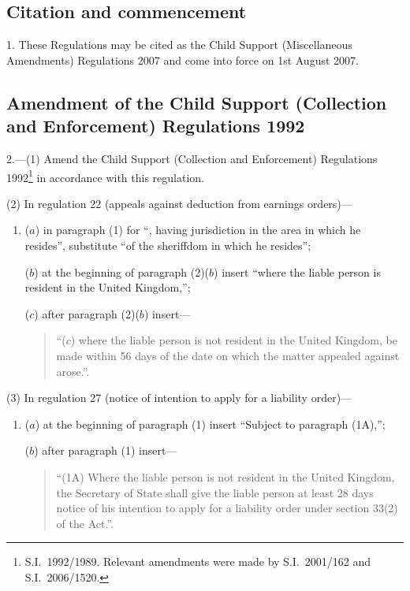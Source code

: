 \documentclass[12pt,a4paper]{article}
\begin{document}
\setcounter{secnumdepth}{-2}

\subsection[1. Citation and commencement]{Citation and commencement}

1.  These Regulations may be cited as the Child Support (Miscellaneous Amendments) Regulations 2007 and come into force on 1st August 2007.

\subsection[2. Amendment of the Child Support (Collection and Enforcement) Regulations 1992]{Amendment of the Child Support (Collection and Enforcement) Regulations 1992}

2.---(1)  Amend the Child Support (Collection and Enforcement) Regulations 1992\footnote{S.I.\ 1992/1989. Relevant amendments were made by S.I.\ 2001/162 and S.I.\ 2006/1520.} in accordance with this regulation.

(2) In regulation 22 (appeals against deduction from earnings orders)—
\begin{enumerate}\item[]
($a$) in paragraph (1) for “, having jurisdiction in the area in which he resides”, substitute “of the sheriffdom in which he resides”;

($b$) at the beginning of paragraph (2)($b$)  insert “where the liable person is resident in the United Kingdom,”;

($c$) after paragraph (2)($b$)  insert—
\begin{quotation}
“($c$) where the liable person is not resident in the United Kingdom, be made within 56 days of the date on which the matter appealed against arose.”.
\end{quotation}
\end{enumerate}

(3) In regulation 27 (notice of intention to apply for a liability order)—
\begin{enumerate}\item[]
($a$) at the beginning of paragraph (1) insert “Subject to paragraph (1A),”;

($b$) after paragraph (1) insert—
\begin{quotation}
“(1A) Where the liable person is not resident in the United Kingdom, the Secretary of State shall give the liable person at least 28 days notice of his intention to apply for a liability order under section 33(2) of the Act.”.
\end{quotation}
\end{enumerate}
\end{document}
